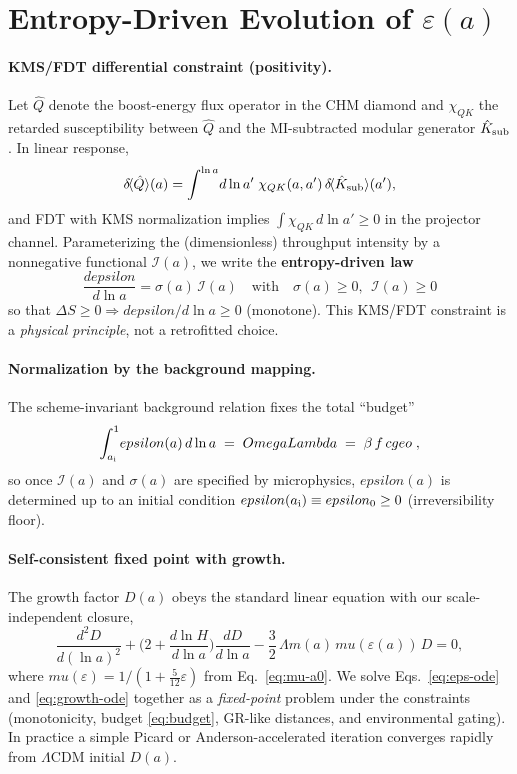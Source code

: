 \documentclass[aps,prd,onecolumn,superscriptaddress,nofootinbib]{revtex4-2}
\def\OmL{OmegaLambda}%
\def\cgeo{cgeo}%
\def\eps{epsilon}%
\def\boxed#1{#1}%
\def\mu{mu}%
\def\Omega_\Lambda{OmegaLambda}%
\providecommand{\OmL}{\Omega_\Lambda}
\providecommand{\cgeo}{c_{\rm geo}}
\providecommand{\eps}{\varepsilon}
\begin{document}
\section{Entropy-Driven Evolution of \texorpdfstring{$\varepsilon(a)$}{epsilon(a)}}
\label{sec:epsilon}
\paragraph{KMS/FDT differential constraint (positivity).}
Let \(\hat Q\) denote the boost-energy flux operator in the CHM diamond and \(\chi_{QK}\) the retarded susceptibility between \(\hat Q\) and the MI-subtracted modular generator \(\hat K_{\rm sub}\). In linear response,
\[
\delta\!\langle \hat Q\rangle(a) = \int^{\ln a}\! d\ln a' \; \chi_{QK}(a,a')\, \delta\!\langle \hat K_{\rm sub}\rangle(a'),
\]
and FDT with KMS normalization implies \(\int \chi_{QK}\,d\ln a'\ge 0\) in the projector channel. Parameterizing the (dimensionless) throughput intensity by a nonnegative functional \(\mathcal I(a)\), we write the \textbf{entropy-driven law}
\begin{equation}
\label{eq:eps-ode}
\boxed{\;\frac{d\eps}{d\ln a} = \sigma(a)\,\mathcal I(a)\quad\text{with}\quad \sigma(a)\ge 0,\ \ \mathcal I(a)\ge 0\;}
\end{equation}
so that \(\Delta S\ge 0\Rightarrow d\eps/d\ln a\ge 0\) (monotone). This KMS/FDT constraint is a \emph{physical principle}, not a retrofitted choice.

\paragraph{Normalization by the background mapping.}
The scheme-invariant background relation fixes the total ``budget''
\begin{equation}
\label{eq:budget}
\boxed{\;\int_{a_{\rm i}}^{1}\!\eps(a)\, d\ln a \;=\; \OmL \;=\; \beta\, f\,\cgeo\; ,\;}
\end{equation}
so once \(\mathcal I(a)\) and \(\sigma(a)\) are specified by microphysics, \(\eps(a)\) is determined up to an initial condition \(\eps(a_{\rm i})\equiv \eps_0\ge 0\) (irreversibility floor).

\paragraph{Self-consistent fixed point with growth.}
The growth factor \(D(a)\) obeys the standard linear equation with our scale-independent closure,
\begin{equation}
\label{eq:growth-ode}
\frac{d^2 D}{d(\ln a)^2}
+\Big(2+\frac{d\ln H}{d\ln a}\Big)\frac{dD}{d\ln a}
-\frac{3}{2}\,\Omega_m(a)\,\mu(\varepsilon(a))\,D=0,
\end{equation}
where \(\mu(\varepsilon)=1/(1+\tfrac{5}{12}\varepsilon)\) from Eq.~\eqref{eq:mu-a0}. We solve Eqs.~\eqref{eq:eps-ode} and \eqref{eq:growth-ode} together as a \emph{fixed-point} problem under the constraints (monotonicity, budget \eqref{eq:budget}, GR-like distances, and environmental gating). In practice a simple Picard or Anderson-accelerated iteration converges rapidly from \(\Lambda\)CDM initial \(D(a)\).
\end{document}
